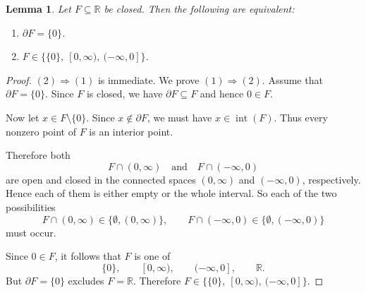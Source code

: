 \documentclass[12pt]{amsart}
\newtheorem{lem}[thm]{Lemma}
\theoremstyle{definition}
\begin{document}
\begin{lem}\label{lem partial F contains nonzero}
Let \(F\subseteq \mathbb R\) be closed. Then the following are equivalent:
\begin{enumerate}
\item[{\rm (1)}] \(\partial F=\{0\}\).
\item[{\rm (2)}] \(F\in \bigl\{\{0\},\ [0,\infty),\ (-\infty,0]\bigr\}\).
\end{enumerate}
\end{lem}

\begin{proof}
\((2)\Rightarrow (1)\) is immediate. 
We prove \((1)\Rightarrow (2)\). Assume that $\partial F=\{0\}$. 
Since \(F\) is closed, we have \(\partial F\subseteq F\) and hence $0\in F$. 

Now let \(x\in F\setminus\{0\}\). Since \(x\notin \partial F\), we must have \(x\in \operatorname{int}(F)\). Thus every nonzero point of \(F\) is an interior point.

Therefore both
\[
F\cap (0,\infty)
\quad\text{and}\quad
F\cap (-\infty,0)
\]
are open and closed in the connected spaces \((0,\infty)\) and \((-\infty,0)\), respectively. Hence each of them is either empty or the whole interval. So each of the two possibilities
\[
F\cap (0,\infty)\in\{\emptyset,(0,\infty)\},
\qquad
F\cap (-\infty,0)\in\{\emptyset,(-\infty,0)\}
\]
must occur.

Since \(0\in F\), it follows that \(F\) is one of
\[
\{0\},\qquad [0,\infty),\qquad (-\infty,0],\qquad \mathbb R.
\]
But \(\partial F=\{0\}\) excludes \(F=\mathbb R\). Therefore $
F\in \bigl\{\{0\},\ [0,\infty),\ (-\infty,0]\bigr\}.$
\end{proof}




\end{document}
